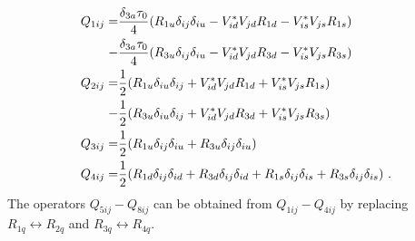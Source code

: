 \begin{align}\label{eq:dependenciesoperators}
	Q_{1ij} =&\frac{\delta_{3a}\tau_{0}}{4}(R_{1u}\delta_{ij}\delta_{iu} - V_{id}^*V_{jd}R_{1d} - V_{is}^*V_{js}R_{1s})\notag \\
	-&\frac{\delta_{3a}\tau_{0}}{4} (R_{3u}\delta_{ij}\delta_{iu} - V_{id}^*V_{jd}R_{3d} - V_{is}^*V_{js}R_{3s})\notag \\
	Q_{2ij} =&\frac{1}{2}(R_{1u}\delta_{iu}\delta_{ij}+ V_{id}^*V_{jd}R_{1d}+ V_{is}^*V_{js}R_{1s})\notag \\
	-&\frac{1}{2}(R_{3u}\delta_{iu}\delta_{ij} + V_{id}^*V_{jd}R_{3d} + V_{is}^*V_{js}R_{3s})\notag \\
	Q_{3ij} =&\frac{1}{2}(R_{1u}\delta_{ij}\delta_{iu} + R_{3u}\delta_{ij}\delta_{iu})\notag \\
	Q_{4ij} =&\frac{1}{2}(R_{1d}\delta_{ij}\delta_{id} + R_{3d}\delta_{ij}\delta_{id} + R_{1s}\delta_{ij}\delta_{is} + R_{3s}\delta_{ij}\delta_{is}) \ .
\end{align}
The operators $Q_{5ij}-Q_{8ij}$ can be obtained from $Q_{1ij}-Q_{4ij}$ by replacing $R_{1q}\leftrightarrow R_{2q}$ and $R_{3q}\leftrightarrow R_{4q}$.

